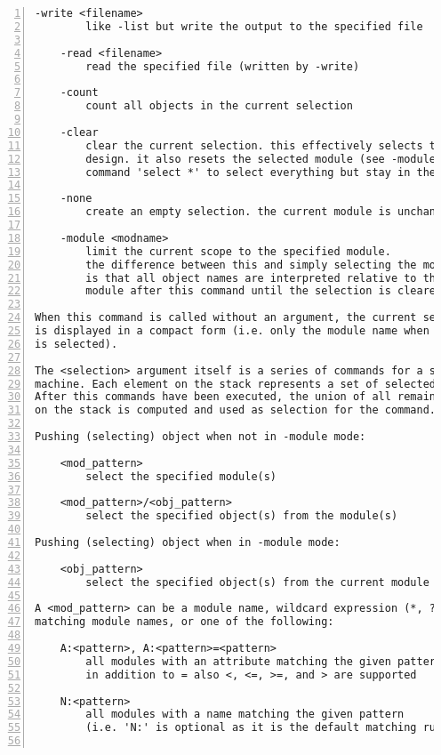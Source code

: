 \begin{lstlisting}[numbers=left,frame=single]
    -write <filename>
        like -list but write the output to the specified file

    -read <filename>
        read the specified file (written by -write)

    -count
        count all objects in the current selection

    -clear
        clear the current selection. this effectively selects the whole
        design. it also resets the selected module (see -module). use the
        command 'select *' to select everything but stay in the current module.

    -none
        create an empty selection. the current module is unchanged.

    -module <modname>
        limit the current scope to the specified module.
        the difference between this and simply selecting the module
        is that all object names are interpreted relative to this
        module after this command until the selection is cleared again.

When this command is called without an argument, the current selection
is displayed in a compact form (i.e. only the module name when a whole module
is selected).

The <selection> argument itself is a series of commands for a simple stack
machine. Each element on the stack represents a set of selected objects.
After this commands have been executed, the union of all remaining sets
on the stack is computed and used as selection for the command.

Pushing (selecting) object when not in -module mode:

    <mod_pattern>
        select the specified module(s)

    <mod_pattern>/<obj_pattern>
        select the specified object(s) from the module(s)

Pushing (selecting) object when in -module mode:

    <obj_pattern>
        select the specified object(s) from the current module

A <mod_pattern> can be a module name, wildcard expression (*, ?, [..])
matching module names, or one of the following:

    A:<pattern>, A:<pattern>=<pattern>
        all modules with an attribute matching the given pattern
        in addition to = also <, <=, >=, and > are supported

    N:<pattern>
        all modules with a name matching the given pattern
        (i.e. 'N:' is optional as it is the default matching rule)


\end{lstlisting}
